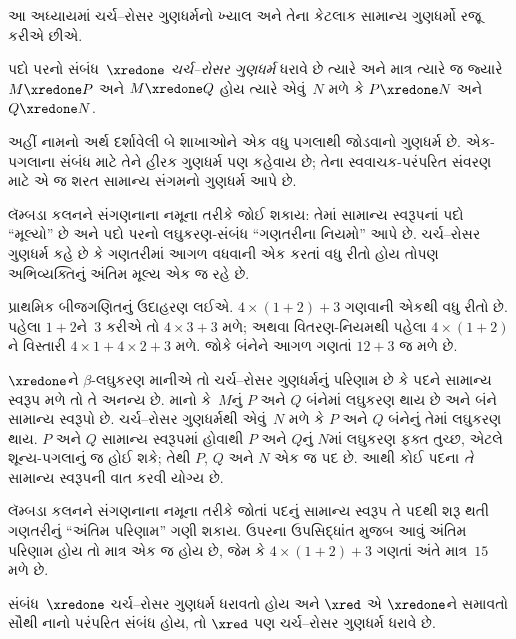\documentclass[../../../include/open-logic-section]{subfiles}
\begin{document}


આ અધ્યાયમાં ચર્ચ--રોસર ગુણધર્મનો ખ્યાલ અને તેના
કેટલાક સામાન્ય ગુણધર્મો રજૂ કરીએ છીએ.

\begin{defn}[ચર્ચ--રોસર ગુણધર્મ, CR]
  પદો પરનો સંબંધ~$\xredone$ \emph{ચર્ચ--રોસર ગુણધર્મ}
  ધરાવે છે ત્યારે અને માત્ર ત્યારે જ જ્યારે
  $M \xredone P$ અને $M \xredone Q$ હોય ત્યારે
  એવું~$N$ મળે કે $P \xredone N$ અને
  $Q \xredone N$.
\end{defn}

અહીં નામનો અર્થ દર્શાવેલી બે શાખાઓને એક વધુ પગલાથી
જોડવાનો ગુણધર્મ છે. એક-પગલાના સંબંધ માટે તેને હીરક
ગુણધર્મ પણ કહેવાય છે; તેના સ્વવાચક-પરંપરિત સંવરણ માટે
એ જ શરત સામાન્ય સંગમનો ગુણધર્મ આપે છે.

લૅમ્બડા કલનને સંગણનાના નમૂના તરીકે જોઈ શકાય: તેમાં
સામાન્ય સ્વરૂપનાં પદો ``મૂલ્યો'' છે અને પદો પરનો
લઘુકરણ-સંબંધ ``ગણતરીના નિયમો'' આપે છે. ચર્ચ--રોસર
ગુણધર્મ કહે છે કે ગણતરીમાં આગળ વધવાની એક કરતાં વધુ
રીતો હોય તોપણ અભિવ્યક્તિનું અંતિમ મૂલ્ય એક જ રહે છે.

પ્રાથમિક બીજગણિતનું ઉદાહરણ લઈએ. $4 \times (1+2) + 3$
ગણવાની એકથી વધુ રીતો છે. પહેલા $1+2$ને~$3$ કરીએ તો
$4 \times 3+3$ મળે; અથવા વિતરણ-નિયમથી પહેલા
$4 \times (1+2)$ને વિસ્તારી $4 \times 1+4
\times 2+3$ મળે. જોકે બંનેને આગળ ગણતાં $12+3$ જ
મળે છે.

$\xredone$ને $\beta$-લઘુકરણ માનીએ તો ચર્ચ--રોસર
ગુણધર્મનું પરિણામ છે કે પદને સામાન્ય સ્વરૂપ મળે તો તે
અનન્ય છે. માનો કે~$M$નું $P$ અને $Q$ બંનેમાં લઘુકરણ
થાય છે અને બંને સામાન્ય સ્વરૂપો છે. ચર્ચ--રોસર
ગુણધર્મથી એવું~$N$ મળે કે $P$ અને $Q$ બંનેનું
તેમાં લઘુકરણ થાય. $P$ અને $Q$ સામાન્ય સ્વરૂપમાં
હોવાથી $P$ અને $Q$નું $N$માં લઘુકરણ ફક્ત તુચ્છ,
એટલે શૂન્ય-પગલાનું જ
હોઈ શકે; તેથી $P$, $Q$ અને $N$ એક જ પદ છે. આથી
કોઈ પદના \emph{તે} સામાન્ય સ્વરૂપની વાત કરવી યોગ્ય છે.

લૅમ્બડા કલનને સંગણનાના નમૂના તરીકે જોતાં પદનું સામાન્ય
સ્વરૂપ તે પદથી શરૂ થતી ગણતરીનું ``અંતિમ પરિણામ''
ગણી શકાય. ઉપરના ઉપસિદ્ધાંત મુજબ આવું અંતિમ પરિણામ
હોય તો માત્ર એક જ હોય છે, જેમ કે $4 \times (1+2)+3$
ગણતાં અંતે માત્ર~$15$ મળે છે.

\begin{thm} 
  સંબંધ~$\xredone$ ચર્ચ--રોસર ગુણધર્મ ધરાવતો હોય
  અને $\xred$ એ $\xredone$ને સમાવતો સૌથી નાનો
  પરંપરિત સંબંધ હોય, તો $\xred$ પણ ચર્ચ--રોસર
  ગુણધર્મ ધરાવે છે.
\end{thm}
\end{document}
